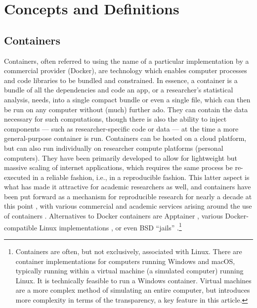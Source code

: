 \documentclass[inline]{hdsr}
\begin{document}
\section{Concepts and Definitions}

\subsection{Containers}

Containers, often referred to using the name of a particular implementation by a commercial provider (Docker), are technology which enables computer processes and code libraries to be bundled and constrained. In essence, a container is a bundle of all the dependencies and code an app, or a researcher's statistical analysis, needs, into a single compact bundle or even a single file, which can then be run on any computer without (much) further ado. They can  contain the data necessary for such computations, though there is also the ability to inject components --- such as researcher-specific code or data --- at the time a more general-purpose container is run. Containers can be hosted on a cloud platform, but can also run individually on researcher compute platforms (personal computers). They have been primarily developed to allow for lightweight but massive scaling of internet applications, which requires the same process be re-executed in a reliable fashion, i.e., in a reproducible fashion. This latter aspect is what has made it attractive for academic researchers as well, and containers have been put forward as a mechanism for reproducible research for nearly a decade at this point \citep{boettiger_introduction_2015}, with various commercial and academic services arising around the use of containers \citep{clyburne-sherin_computational_2019,chard_toward_2020,brinckman_computing_2018}. Alternatives to Docker containers are Apptainer \citep{contributors_to_the_apptainer_project_apptainer_2025}, various Docker-compatible Linux implementations \citep[for instance, ][]{noauthor_podman_nodate}, or even BSD ``jails'' \citep{the_freebsd_project_chapter_2025}.\footnote{Containers are often, but not exclusively, associated with Linux.  There are container implementations for computers running Windows and macOS, typically running within a virtual machine (a simulated computer) running Linux. It is technically feasible to run a Windows container. Virtual machines are a more complex method of simulating an entire computer, but introduces more complexity in terms of the transparency, a key feature in this article.} 
\end{document}
